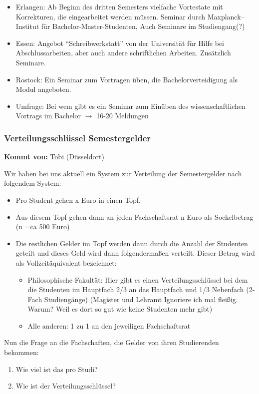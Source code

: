 \begin{itemize}
          \item Erlangen: Ab Beginn des dritten Semesters vielfache Vortestate mit Korrekturen, die eingearbeitet werden müssen. Seminar durch Maxplanck–Institut für Bachelor-Master-Studenten, Auch Seminare im Studiengang(?)
          \item Essen: Angebot “Schreibwerkstatt” von der Universität für Hilfe bei Abschlussarbeiten, aber auch andere schriftlichen Arbeiten. Zusätzlich Seminare.
          \item Rostock: Ein Seminar zum Vortragen üben, die Bachelorverteidigung als Modul angeboten.
          \item Umfrage: Bei wem gibt es ein Seminar zum Einüben des wissenschaftlichen Vortrags im Bachelor $\rightarrow$ 16-20 Meldungen
        \end{itemize}

    \subsubsection*{Verteilungsschlüssel Semestergelder}
      \textbf{Kommt von:} Tobi (Düsseldort)

Wir haben bei uns aktuell ein System zur Verteilung der Semestergelder nach folgendem System: \\

      \begin{itemize}
        \item Pro Student gehen x Euro in einen Topf.
        \item Aus diesem Topf gehen dann an jeden Fachschaftsrat n Euro als Sockelbetrag (n =ca 500 Euro)
        \item Die restlichen Gelder im Topf werden dann durch die Anzahl der Studenten geteilt und dieses Geld wird dann folgendermaßen verteilt. Dieser Betrag wird als Vollzeitäquivalent bezeichnet:
          \begin{itemize}
            \item Philosophische Fakultät: Hier gibt es einen Verteilungsschlüssel bei dem die Studenten im Hauptfach 2/3 an das Hauptfach und 1/3 Nebenfach (2-Fach Studiengänge) (Magister und Lehramt Ignoriere ich mal fleißig. Warum? Weil es dort so gut wie keine Studenten mehr gibt)
            \item Alle anderen: 1 zu 1 an den jeweiligen Fachschaftsrat
          \end{itemize}
      \end{itemize}
      Nun die Frage an die Fachschaften, die Gelder von ihren Studierenden bekommen: \\
      \begin{enumerate}
        \item Wie viel ist das pro Studi?
        \item Wie ist der Verteilungsschlüssel?
      \end{enumerate}

